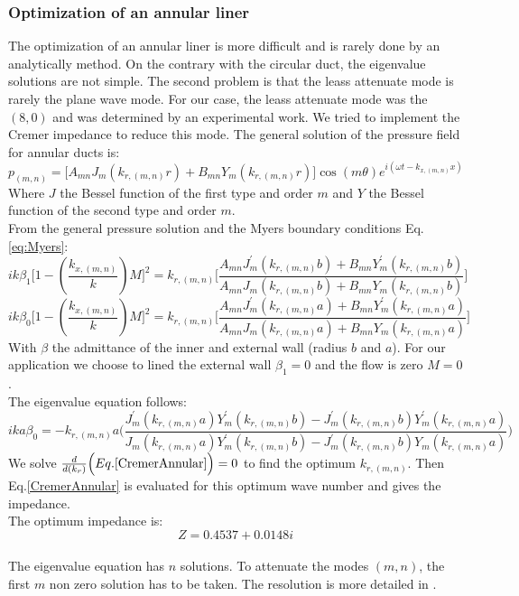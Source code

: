 \subsubsection{Optimization of an annular liner}
The optimization of an annular liner is more difficult and is rarely done by an analytically method. On the contrary with the circular duct, the eigenvalue solutions are not simple. The second problem is that the leass attenuate mode is rarely the plane wave mode. For our case, the leass attenuate mode was the $(8,0)$ and was determined by an experimental work. We tried to implement the Cremer impedance to reduce this mode.
The general solution of the pressure field for annular ducts is:
\begin{equation}
    p_{(m,n)}=\Big[A_{mn}J_m(k_{r,(m,n)}r)+B_{mn}Y_m(k_{r,(m,n)}r)\Big]\cos (m\theta) e^{i(\omega t-k_{x,(m,n)}x)}
\end{equation}
Where $J$ the Bessel function of the first type and order $m$ and $Y$ the Bessel function of the second type and order $m$.\\
From the general pressure solution and the Myers boundary conditions Eq.\eqref{eq:Myers}:
\begin{equation}
    ik\beta_1\Big[1-(\frac{k_{x,(m,n)}}{k})M\Big]^2=k_{r,(m,n)}\Bigg[\frac{A_{mn}J_m^'(k_{r,(m,n)}b)+B_{mn}Y_m^'(k_{r,(m,n)}b)}{A_{mn}J_m(k_{r,(m,n)}b)+B_{mn}Y_m(k_{r,(m,n)}b)}\Bigg]
\end{equation}
\begin{equation}
    ik\beta_0\Big[1-(\frac{k_{x,(m,n)}}{k})M\Big]^2=k_{r,(m,n)}\Bigg[\frac{A_{mn}J_m^'(k_{r,(m,n)}a)+B_{mn}Y_m^'(k_{r,(m,n)}a)}{A_{mn}J_m(k_{r,(m,n)}a)+B_{mn}Y_m(k_{r,(m,n)}a)}\Bigg]
\end{equation}
With $\beta$ the admittance of the inner and external wall (radius $b$ and $a$). For our application we choose to lined the external wall $\beta_1=0$ and the flow is zero $M=0$.\\
The eigenvalue equation follows:
\begin{equation}\label{CremerAnnular}
    ika\beta_0=-k_{r,(m,n)}a\Bigg(\frac{J_m^'(k_{r,(m,n)}a)Y_m^'(k_{r,(m,n)}b)-J_m^'(k_{r,(m,n)}b)Y_m^'(k_{r,(m,n)}a)}{J_m(k_{r,(m,n)}a)Y_m^'(k_{r,(m,n)}b)-J_m^'(k_{r,(m,n)}b)Y_m(k_{r,(m,n)}a)}\Bigg)
\end{equation}
We solve $\frac{d}{d(k_r)}\Big(Eq.\eqref{CremerAnnular}\Big)=0$ to find the optimum $k_{r,(m,n)}$. Then Eq.\eqref{CremerAnnular} is evaluated for this optimum wave number and gives the impedance.\\
The optimum impedance is: 
\begin{equation}
    Z=0.4537 + 0.0148i
\end{equation}\\
The eigenvalue equation has $n$ solutions. To attenuate the modes $(m,n)$, the first $m$ non zero solution has to be taken. The resolution is more detailed in .
\clearpage
